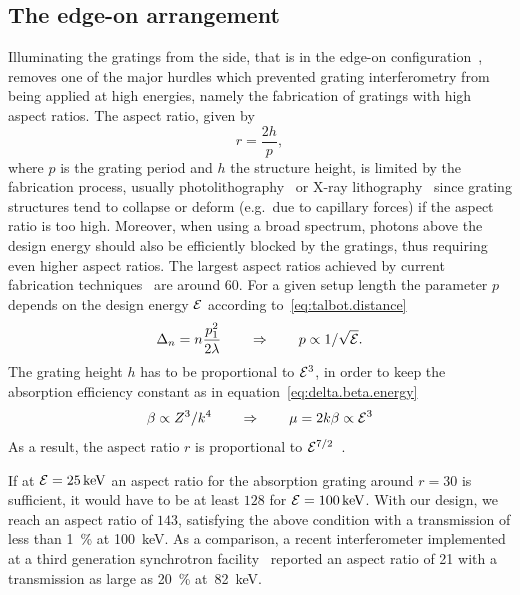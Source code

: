 \subsection{The edge-on arrangement}\label{sec:edge-on-arrangement}
Illuminating the gratings from the side, that is in the edge-on
configuration~\parencite{david2014method}, removes one of the major hurdles which prevented grating interferometry from
being applied at high energies, namely the fabrication of gratings
with high aspect ratios. The aspect ratio, given by
\begin{equation}
    r = \frac{2h}{p},
\end{equation}
where $p$ is the
grating period and $h$ the  structure height, is limited by the
fabrication process, usually photolithography~\parencite{David_2002} or X-ray
lithography~\parencite{Mohr2012} since grating structures tend to collapse or deform
(e.g.\ due to capillary forces) if the aspect ratio is too high.
Moreover, when using a broad spectrum, photons above the design energy
should also be efficiently blocked by the gratings, thus requiring even
higher aspect ratios. The largest aspect ratios achieved by current
fabrication techniques~\parencite{David2007,Kenntner2010} are around 60.
For a given setup length the parameter $p$ depends on the design energy
$\mathcal{E}$ according to~\eqref{eq:talbot.distance}
\begin{equation}
    \Delta_n = n \frac{p_1^2}{2 \lambda} \qquad \Rightarrow \qquad p \propto 1/\sqrt{\mathcal{E}}.\label{eq:period.energy}
\end{equation}
The grating height $h$ has to be proportional to $\mathcal{E}^3$, in order to
keep the absorption efficiency constant as in
equation~\eqref{eq:delta.beta.energy}
\begin{equation}
    \beta \propto Z^3 / k^4 \qquad \Rightarrow \qquad \mu = 2k\beta \propto
    \mathcal{E}^3
    \label{eq:absorption.energy}
\end{equation}
As a result, the aspect ratio $r$ is proportional to $\mathcal{E}^{7/2}$~\parencite{Momose2003a}.

If at $\mathcal{E}=\SI{25}{\kilo\electronvolt}$ an aspect ratio for the
absorption grating around $r=30$ is sufficient, it would have
to be at least $\num{128}$ for $\energy=\SI{100}{\kilo\eV}$. With our
design, we reach an aspect ratio of $\num{143}$, satisfying the above
condition with a transmission of less than \SI{1}{\percent} at
\SI{100}{\kilo\eV}. As a comparison, a recent interferometer implemented at
a third generation synchrotron facility~\parencite{Willner2013} reported an
aspect ratio of \num{21} with a transmission as large as \SI{20}{\percent}
at~\SI{82}{\kilo\eV}.

